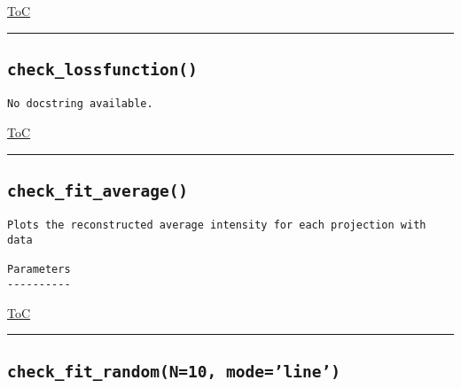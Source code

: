 \documentclass{article}
\begin{document}
\begin{flushright}

\hyperref[toc]{ToC}

\end{flushright}



\vspace{5mm}

\hrule

\subsection*{\texttt{check\_lossfunction()}}

\begin{lstlisting}[language=docstring]
No docstring available.
\end{lstlisting}

\begin{flushright}

\hyperref[toc]{ToC}

\end{flushright}



\vspace{5mm}

\hrule

\subsection*{\texttt{check\_fit\_average()}}

\begin{lstlisting}[language=docstring]
Plots the reconstructed average intensity for each projection with data

Parameters
----------
\end{lstlisting}

\begin{flushright}

\hyperref[toc]{ToC}

\end{flushright}



\vspace{5mm}

\hrule

\subsection*{\texttt{check\_fit\_random(N=10, mode='line')}}
\end{document}
